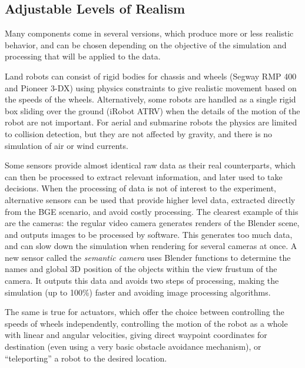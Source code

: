 \documentclass{llncs}
\begin{document}
\subsection{Adjustable Levels of Realism}
\label{section:realism}

Many components come in several versions, which produce more or less
realistic behavior, and can be chosen depending on the objective of the
simulation and processing that will be applied to the data.

Land robots can consist of rigid bodies for chassis and wheels (Segway RMP 400
and Pioneer 3-DX) using physics constraints to give realistic movement based on
the speeds of the wheels. Alternatively, some robots are handled as a single
rigid box sliding over the ground (iRobot ATRV) when the details of the motion
of the robot are not important. For aerial and submarine robots the
physics are limited to collision detection, but they are not affected by
gravity, and there is no simulation of air or wind currents.

Some sensors provide almost identical raw data as their real counterparts,
which can then be processed to extract relevant information,
and later used to take decisions. When the processing of data is not of
interest to the experiment, alternative sensors can be used that provide
higher level data, extracted directly from the BGE scenario, and avoid costly
processing.
The clearest example of this are the cameras: the regular video camera
generates renders of the Blender scene, and outputs images to be processed by
software. This generates too much data, and can slow down the simulation when
rendering for several cameras at once. A new sensor called the \emph{semantic
camera} uses Blender functions to determine the names and global 3D position of
the objects within the view frustum of the camera. It outputs this data and
avoids two steps of processing, making the simulation (up to 100\%) faster and
avoiding image processing algorithms.

The same is true for actuators, which offer the choice between controlling the
speeds of wheels independently, controlling the motion of the robot as a whole
with linear and angular velocities, giving direct waypoint coordinates for
destination (even using a very basic obstacle avoidance mechanism), or
``teleporting'' a robot to the desired location.
\end{document}
